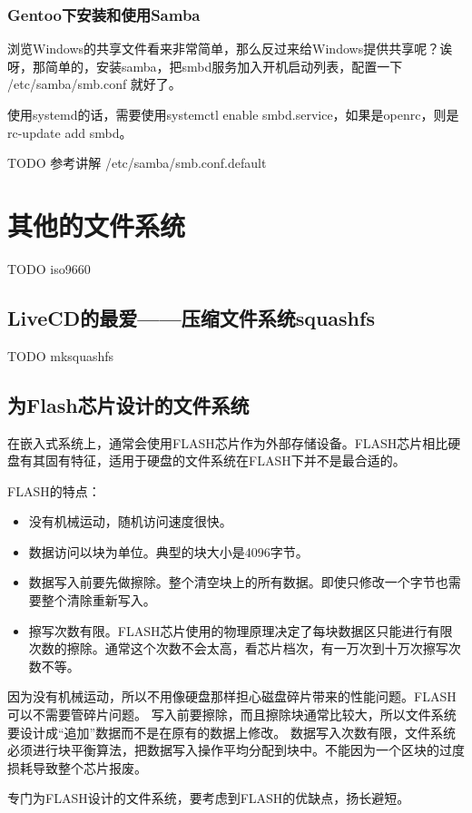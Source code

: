 \subsubsection{Gentoo下安装和使用Samba}

浏览Windows的共享文件看来非常简单，那么反过来给Windows提供共享呢？诶呀，那简单的，安装samba，把smbd服务加入开机启动列表，配置一下 /etc/samba/smb.conf 就好了。

使用systemd的话，需要使用systemctl enable smbd.service，如果是openrc，则是 rc-update add smbd。

TODO
参考讲解
/etc/samba/smb.conf.default

\section{其他的文件系统}

TODO iso9660 


\subsection{LiveCD的最爱——压缩文件系统squashfs}

TODO mksquashfs 



\subsection{为Flash芯片设计的文件系统}

在嵌入式系统上，通常会使用FLASH芯片作为外部存储设备。FLASH芯片相比硬盘有其固有特征，适用于硬盘的文件系统在FLASH下并不是最合适的。

FLASH的特点：

\begin{itemize}
\item 没有机械运动，随机访问速度很快。
\item 数据访问以块为单位。典型的块大小是4096字节。
\item 数据写入前要先做擦除。整个清空块上的所有数据。即使只修改一个字节也需要整个清除重新写入。
\item 擦写次数有限。FLASH芯片使用的物理原理决定了每块数据区只能进行有限次数的擦除。通常这个次数不会太高，看芯片档次，有一万次到十万次擦写次数不等。
\end{itemize}

因为没有机械运动，所以不用像硬盘那样担心磁盘碎片带来的性能问题。FLASH可以不需要管碎片问题。
写入前要擦除，而且擦除块通常比较大，所以文件系统要设计成“追加”数据而不是在原有的数据上修改。
数据写入次数有限，文件系统必须进行块平衡算法，把数据写入操作平均分配到块中。不能因为一个区块的过度损耗导致整个芯片报废。

专门为FLASH设计的文件系统，要考虑到FLASH的优缺点，扬长避短。
